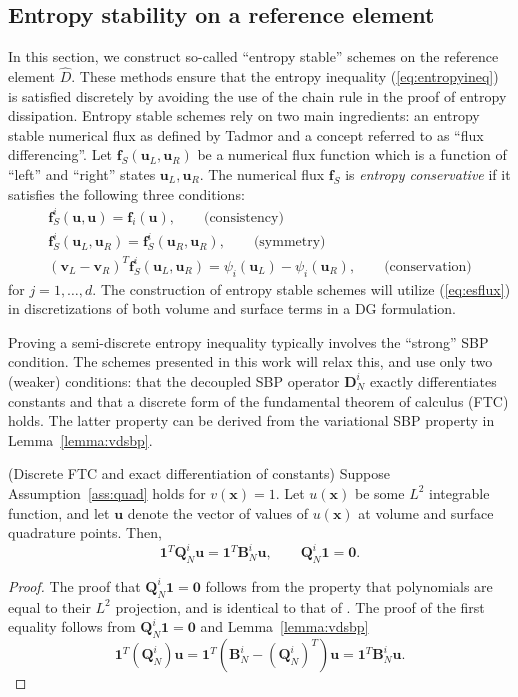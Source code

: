 \documentclass{svjour3}                     %
\renewcommand{\hat}{\widehat}
\newcommand{\LRp}[1]{\left( #1 \right)}
\begin{document}
\subsection{Entropy stability on a reference element}
\label{sec:singleelem}

In this section, we construct so-called ``entropy stable'' schemes on the reference element $\hat{D}$.  These methods ensure that the entropy inequality (\ref{eq:entropyineq}) is satisfied discretely by avoiding the use of the chain rule in the proof of entropy dissipation.  Entropy stable schemes rely on two main ingredients: an entropy stable numerical flux as defined by Tadmor \cite{tadmor1987numerical} and a concept referred to as ``flux differencing''.  Let $\bm{f}_S\LRp{\bm{u}_L,\bm{u}_R}$ be a numerical flux function which is a function of ``left'' and ``right'' states $\bm{u}_L,\bm{u}_R$.  The numerical flux $\bm{f}_S$ is \textit{entropy conservative} if it satisfies the following three conditions:  
\begin{gather}
\bm{f}^i_S(\bm{u},\bm{u}) = \bm{f}_i(\bm{u}), \qquad \text{(consistency)}\\
\bm{f}^i_S(\bm{u}_L,\bm{u}_R) = \bm{f}^i_S(\bm{u}_R,\bm{u}_R), \qquad \text{(symmetry)}\nonumber\\
\LRp{\bm{v}_L-\bm{v}_R}^T\bm{f}^i_S(\bm{u}_L,\bm{u}_R) = \psi_i(\bm{u}_L) - \psi_i(\bm{u}_R), \qquad \text{(conservation)}\nonumber
\label{eq:esflux}
\end{gather}
for $j = 1,\ldots, d$.  The construction of entropy stable schemes will utilize (\ref{eq:esflux}) in discretizations of both volume and surface terms in a DG formulation.  

Proving a semi-discrete entropy inequality typically involves the ``strong'' SBP condition.  The schemes presented in this work will relax this, and use only two (weaker) conditions: that the decoupled SBP operator $\bm{D}^i_N$ exactly differentiates constants and that a discrete form of the fundamental theorem of calculus (FTC) holds.  The latter property can be derived from the variational SBP property in Lemma~\ref{lemma:vdsbp}.

\begin{lemma}{(Discrete FTC and exact differentiation of constants)}
\label{lemma:sbpcor}
Suppose Assumption~\ref{ass:quad} holds for $v(\bm{x}) = 1$.  
Let $u(\bm{x})$ be some $L^2$ integrable function, and let $\bm{u}$ denote the vector of values of $u(\bm{x})$ at volume and surface quadrature points. Then, 
\[
\bm{1}^T\bm{Q}^i_N\bm{u} = \bm{1}^T\bm{B}^i_N\bm{u}, \qquad \bm{Q}^i_N\bm{1} = \bm{0}.
\]
\end{lemma}
\begin{proof}
The proof that $\bm{Q}^i_N \bm{1} = \bm{0}$ follows from the property that polynomials are equal to their $L^2$ projection, and is identical to that of \cite{chan2017discretely,chan2018discretely}.     The proof of the first equality follows from $\bm{Q}^i_N \bm{1} = \bm{0}$ and Lemma~\ref{lemma:vdsbp} 
\[
\bm{1}^T\LRp{\bm{Q}^i_N}\bm{u} = \bm{1}^T\LRp{\bm{B}^i_N - \LRp{\bm{Q}^i_N}^T}\bm{u} = \bm{1}^T{\bm{B}^i_N}\bm{u}.
\]
\end{proof}
\end{document}
